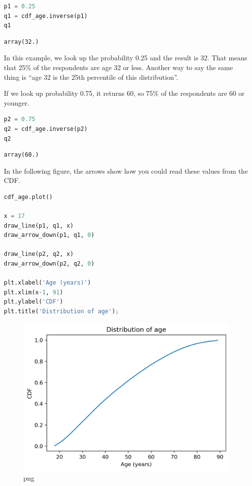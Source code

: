 \documentclass[
]{book}
\begin{document}
\begin{lstlisting}[language=Python]
p1 = 0.25
q1 = cdf_age.inverse(p1)
q1
\end{lstlisting}

\begin{lstlisting}
array(32.)
\end{lstlisting}

In this example, we look up the probability 0.25 and the result is 32.
That means that 25\% of the respondents are age 32 or less. Another way
to say the same thing is ``age 32 is the 25th percentile of this
distribution''.

If we look up probability 0.75, it returns 60, so 75\% of the
respondents are 60 or younger.

\begin{lstlisting}[language=Python]
p2 = 0.75
q2 = cdf_age.inverse(p2)
q2
\end{lstlisting}

\begin{lstlisting}
array(60.)
\end{lstlisting}

In the following figure, the arrows show how you could read these values
from the CDF.

\begin{lstlisting}[language=Python]
cdf_age.plot()

x = 17
draw_line(p1, q1, x)
draw_arrow_down(p1, q1, 0)

draw_line(p2, q2, x)
draw_arrow_down(p2, q2, 0)

plt.xlabel('Age (years)')
plt.xlim(x-1, 91)
plt.ylabel('CDF')
plt.title('Distribution of age');
\end{lstlisting}

\begin{figure}
\centering
\includegraphics{08_distributions_files/08_distributions_67_0.png}
\caption{png}
\end{figure}
\end{document}
